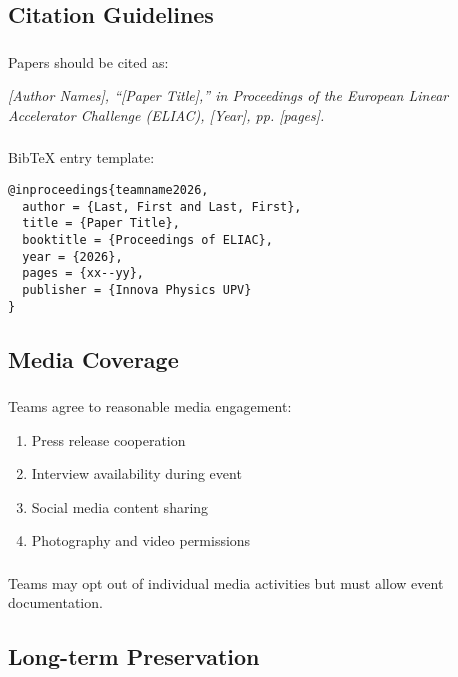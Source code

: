 \subsection{Citation Guidelines}

\subsubsection{}
Papers should be cited as:

\noindent\textit{[Author Names], ``[Paper Title],'' in Proceedings of the European Linear Accelerator Challenge (ELIAC), [Year], pp. [pages].}

\subsubsection{}
BibTeX entry template:
\begin{verbatim}
@inproceedings{teamname2026,
  author = {Last, First and Last, First},
  title = {Paper Title},
  booktitle = {Proceedings of ELIAC},
  year = {2026},
  pages = {xx--yy},
  publisher = {Innova Physics UPV}
}
\end{verbatim}

\subsection{Media Coverage}

\subsubsection{}
Teams agree to reasonable media engagement:
\begin{enumerate}[noitemsep]
    \item Press release cooperation
    \item Interview availability during event
    \item Social media content sharing
    \item Photography and video permissions
\end{enumerate}

\subsubsection{}
Teams may opt out of individual media activities but must allow event documentation.

\subsection{Long-term Preservation}

